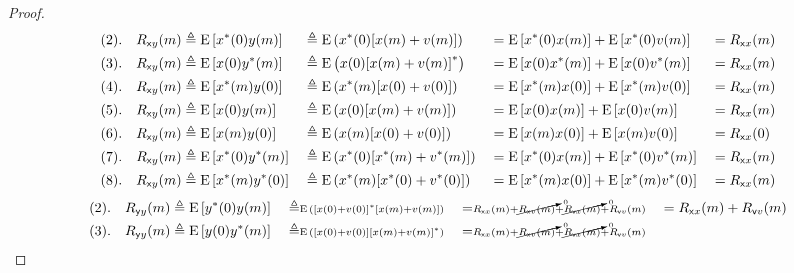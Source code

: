 \begin{proof}
\begin{align*}
    (2).\quad R_{{\mathsf xy}}(m)
       &\triangleq \operatorname{E}{\left[x^\ast(0)y(m)\right]}
      &&\triangleq \operatorname{E}{\left(x^\ast(0){\left[x(m)+v(m)\right]}\right)}
      &&=    \operatorname{E}{\left[x^\ast(0)x(m)\right]} + \operatorname{E}{\left[x^\ast(0)                       v(m)\right]}
      &&=    R_{{\mathsf xx}}(m)
     \\
    (3).\quad R_{{\mathsf xy}}(m)
       &\triangleq \operatorname{E}{\left[x(0)y^\ast(m)\right]}
      &&\triangleq \operatorname{E}{\left(x(0){\left[x(m)+v(m)\right]}^\ast\right)}
      &&=    \operatorname{E}{\left[x(0)x^\ast(m)\right]} + \operatorname{E}{\left[x(0)                       v^\ast(m)\right]}
      &&=    R_{{\mathsf xx}}(m)
     \\
    (4).\quad R_{{\mathsf xy}}(m)
      &\triangleq \operatorname{E}{\left[x^\ast(m)y(0)\right]}
      &&\triangleq \operatorname{E}{\left(x^\ast(m){\left[x(0)+v(0)\right]}\right)}
      &&=    \operatorname{E}{\left[x^\ast(m)x(0)\right]} + \operatorname{E}{\left[x^\ast(m)                       v(0)\right]}
      &&=    R_{{\mathsf xx}}(m)
     \\
    (5).\quad R_{{\mathsf xy}}(m)
      &\triangleq \operatorname{E}{\left[x(0)y(m)\right]}
      &&\triangleq \operatorname{E}{\left(x(0){\left[x(m)+v(m)\right]}\right)}
      &&=    \operatorname{E}{\left[x(0)x(m)\right]} + \operatorname{E}{\left[x(0)                       v(m)\right]}
      &&=    R_{{\mathsf xx}}(m)
     \\
    (6).\quad R_{{\mathsf xy}}(m)
      &\triangleq \operatorname{E}{\left[x(m)y(0)\right]}
      &&\triangleq \operatorname{E}{\left(x(m){\left[x(0)+v(0)\right]}\right)}
      &&=    \operatorname{E}{\left[x(m)x(0)\right]} + \operatorname{E}{\left[x(m)                       v(0)\right]}
      &&=    R_{{\mathsf xx}}(0)
    \\
    (7).\quad R_{{\mathsf xy}}(m)
      &\triangleq \operatorname{E}{\left[x^\ast(0)y^\ast(m)\right]}
      &&\triangleq \operatorname{E}{\left(x^\ast(0){\left[x^\ast(m)+v^\ast(m)\right]}\right)}
      &&=    \operatorname{E}{\left[x^\ast(0)x(m)\right]} + \operatorname{E}{\left[x^\ast(0)                       v^\ast(m)\right]}
      &&=    R_{{\mathsf xx}}(m)
    \\
    (8).\quad R_{{\mathsf xy}}(m)
      &\triangleq \operatorname{E}{\left[x^\ast(m)y^\ast(0)\right]}
      &&\triangleq \operatorname{E}{\left(x^\ast(m){\left[x^\ast(0)+v^\ast(0)\right]}\right)}
      &&=    \operatorname{E}{\left[x^\ast(m)x(0)\right]} + \operatorname{E}{\left[x^\ast(m)                       v^\ast(0)\right]}
      &&=    R_{{\mathsf xx}}(m)
  \end{align*}
  \begin{align*}
    (2).\quad\Ryy(m)
        &\eqd \pE\brs{\rvy^\ast(0)\rvy(m)}
       &&\eqd \scy \pE\brp{\brs{\rvx(0)+\rvv(0)}^\ast\brs{\rvx(m)+\rvv(m)}}
       &&=    \scy \Rxx(m) + \cancelto{0}{\Rxv(m)} + \cancelto{0}{\Rvx(m)} + \Rvv(m)
       &&=    \Rxx(m)                                                 + \Rvv(m)
    \\
    (3).\quad\Ryy(m)
        &\eqd \pE\brs{\rvy(0)\rvy^\ast(m)}
       &&\eqd \scy \pE\brp{\brs{\rvx(0)+\rvv(0)}\brs{\rvx(m)+\rvv(m)}^\ast}
       &&=    \scy \Rxx(m) + \cancelto{0}{\Rxv(m)} + \cancelto{0}{\Rvx(m)} + \Rvv(m)

\end{align*}
\end{proof}

